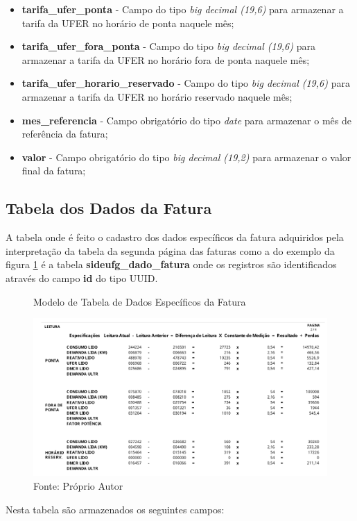 \begin{itemize}
    \item \textbf{tarifa\_ufer\_ponta} - Campo do tipo \textit{big decimal (19,6)} para armazenar a tarifa da UFER no horário de ponta naquele mês;
    \item \textbf{tarifa\_ufer\_fora\_ponta} - Campo do tipo \textit{big decimal (19,6)} para armazenar a tarifa da UFER no horário fora de ponta naquele mês;
    \item \textbf{tarifa\_ufer\_horario\_reservado} - Campo do tipo \textit{big decimal (19,6)} para armazenar a tarifa da UFER no horário reservado naquele mês;
    \item \textbf{mes\_referencia} - Campo obrigatório do tipo \textit{date} para armazenar o mês de referência da fatura;
    \item \textbf{valor} - Campo obrigatório do tipo \textit{big decimal (19,2)} para armazenar o valor final da fatura;
\end{itemize}

\subsection{Tabela dos Dados da Fatura}
\label{sub:tabela-dado-fatura}
A tabela onde é feito o cadastro dos dados específicos da fatura adquiridos pela interpretação da tabela da segunda página das faturas como a do exemplo da figura \ref{fig:modelo-tabela-dados-fatura} é a tabela  \textbf{sideufg\_dado\_fatura} onde os registros são identificados através do campo \textbf{id} do tipo UUID.

\begin{figure}[H]
    \centering
    \caption{Modelo de Tabela de Dados Específicos da Fatura}
\includegraphics[width=0.8\linewidth]{imagens/modelo-tabela-dados-fatura.png}
    \caption*{Fonte: Próprio Autor}
    \label{fig:modelo-tabela-dados-fatura}
\end{figure}

Nesta tabela são armazenados os seguintes campos:

